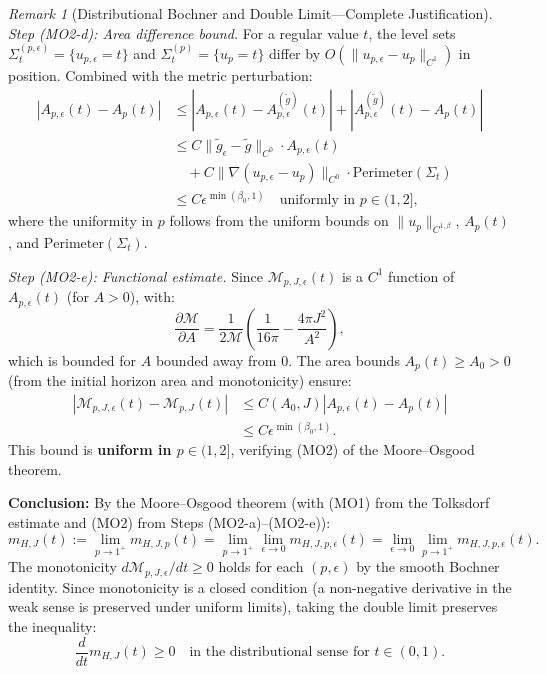 \documentclass[12pt]{article}
\theoremstyle{plain}
\theoremstyle{definition}
\theoremstyle{remark}
\newtheorem{remark}[theorem]{Remark}
\newcommand{\tg}{\tilde{g}}
\begin{document}
\begin{remark}[Distributional Bochner and Double Limit---Complete Justification]
\textit{Step (MO2-d): Area difference bound.} For a regular value $t$, the level sets $\Sigma_t^{(p,\epsilon)} = \{u_{p,\epsilon} = t\}$ and $\Sigma_t^{(p)} = \{u_p = t\}$ differ by $O(\|u_{p,\epsilon} - u_p\|_{C^1})$ in position. Combined with the metric perturbation:
\begin{align*}
|A_{p,\epsilon}(t) - A_p(t)| &\leq |A_{p,\epsilon}(t) - A^{(\tg)}_{p,\epsilon}(t)| + |A^{(\tg)}_{p,\epsilon}(t) - A_p(t)| \\
&\leq C \|\tg_\epsilon - \tg\|_{C^0} \cdot A_{p,\epsilon}(t) \\
&\quad + C \|\nabla(u_{p,\epsilon} - u_p)\|_{C^0} \cdot \text{Perimeter}(\Sigma_t) \\
&\leq C \epsilon^{\min(\beta_0, 1)} \quad \text{uniformly in } p \in (1, 2],
\end{align*}
where the uniformity in $p$ follows from the uniform bounds on $\|u_p\|_{C^{1,\beta}}$, $A_p(t)$, and $\text{Perimeter}(\Sigma_t)$.

\textit{Step (MO2-e): Functional estimate.} Since $\mathcal{M}_{p,J,\epsilon}(t)$ is a $C^1$ function of $A_{p,\epsilon}(t)$ (for $A > 0$), with:
\[
\frac{\partial \mathcal{M}}{\partial A} = \frac{1}{2\mathcal{M}}\left(\frac{1}{16\pi} - \frac{4\pi J^2}{A^2}\right),
\]
which is bounded for $A$ bounded away from 0. The area bounds $A_p(t) \geq A_0 > 0$ (from the initial horizon area and monotonicity) ensure:
\begin{align*}
|\mathcal{M}_{p,J,\epsilon}(t) - \mathcal{M}_{p,J}(t)| &\leq C(A_0, J) |A_{p,\epsilon}(t) - A_p(t)| \\
&\leq C \epsilon^{\min(\beta_0, 1)}.
\end{align*}
This bound is \textbf{uniform in $p \in (1, 2]$}, verifying (MO2) of the Moore--Osgood theorem.

\textbf{Conclusion:} By the Moore--Osgood theorem (with (MO1) from the Tolksdorf estimate and (MO2) from Steps (MO2-a)--(MO2-e)):
\[
m_{H,J}(t) := \lim_{p \to 1^+} m_{H,J,p}(t) = \lim_{p \to 1^+} \lim_{\epsilon \to 0} m_{H,J,p,\epsilon}(t) = \lim_{\epsilon \to 0} \lim_{p \to 1^+} m_{H,J,p,\epsilon}(t).
\]
The monotonicity $d\mathcal{M}_{p,J,\epsilon}/dt \geq 0$ holds for each $(p, \epsilon)$ by the smooth Bochner identity. Since monotonicity is a closed condition (a non-negative derivative in the weak sense is preserved under uniform limits), taking the double limit preserves the inequality:
\[
\frac{d}{dt} m_{H,J}(t) \geq 0 \quad \text{in the distributional sense for } t \in (0, 1).
\]
\end{remark}
\end{document}
